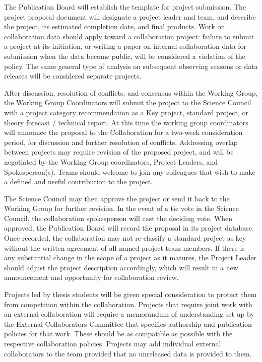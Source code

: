 The Publication Board will establish the template for project submission.  The project proposal document will designate a project leader and team, and describe the project, its estimated completion date, and final products.  Work on collaboration data should apply toward a collaboration project: failure to submit a project at its initiation, or writing a paper on internal collaboration data for submission when the data become public, will be considered a violation of the policy.  The same general type of analysis on subsequent observing seasons or data releases will be considered separate projects.

After discussion, resolution of conflicts, and consensus within the Working Group, the Working Group Coordinators will submit the project to the Science Council with a project category recommendation as a Key project, standard project, or theory forecast / technical report.  At this time the working group coordinators will announce the proposal to the Collaboration for a two-week consideration period, for discussion and further resolution of conflicts.  Addressing overlap between projects may require revision of the proposed project, and will be negotiated by the Working Group coordinators, Project Leaders, and Spokesperson(s).  Teams should welcome to join any colleagues that wish to make a defined and useful contribution to the project.

The Science Council may then approve the project or send it back to the Working Group for further revision.  In the event of a tie vote in the Science Council, the collaboration spokesperson  will cast the deciding vote.  When approved, the Publication Board will record the proposal in its project database.  Once recorded, the collaboration may not re-classify a standard project as key without the written agreement of all named project team members.  If there is any substantial change in the scope of a project as it matures, the Project Leader should adjust the project description accordingly, which will result in a new announcement and opportunity for collaboration review.

Projects led by thesis students will be given special consideration to protect them from competition within the collaboration.  Projects that require joint work with an external collaboration will require a memorandum of understanding set up by the External Collaborators Committee that specifies authorship and publication policies for that work.  These should be as compatible as possible with the respective collaboration policies.  Projects may add individual external collaborators to the team provided that no unreleased data is provided to them.

